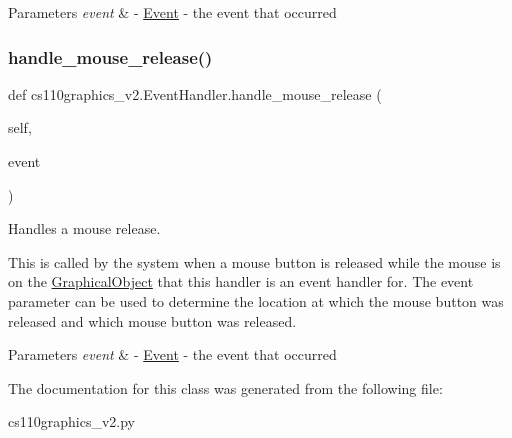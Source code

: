 \begin{DoxyParams}{Parameters}
{\em event} & -\/ \mbox{\hyperlink{classcs110graphics__v2_1_1Event}{Event}} -\/ the event that occurred \\
\hline
\end{DoxyParams}
\mbox{\label{classcs110graphics__v2_1_1EventHandler_a78d4d8dfc24ea86540c3ce9cf2b27a24}} 
\subsubsection{\texorpdfstring{handle\_mouse\_release()}{handle\_mouse\_release()}}
{\footnotesize\ttfamily def cs110graphics\+\_\+v2.\+Event\+Handler.\+handle\+\_\+mouse\+\_\+release (\begin{DoxyParamCaption}\item[{}]{self,  }\item[{}]{event }\end{DoxyParamCaption})}



Handles a mouse release. 

This is called by the system when a mouse button is released while the mouse is on the \mbox{\hyperlink{classcs110graphics__v2_1_1GraphicalObject}{Graphical\+Object}} that this handler is an event handler for. The event parameter can be used to determine the location at which the mouse button was released and which mouse button was released. 
\begin{DoxyCode}{0}
\end{DoxyCode}
 
\begin{DoxyParams}{Parameters}
{\em event} & -\/ \mbox{\hyperlink{classcs110graphics__v2_1_1Event}{Event}} -\/ the event that occurred \\
\hline
\end{DoxyParams}


The documentation for this class was generated from the following file\+:\begin{DoxyCompactItemize}
\item 
cs110graphics\+\_\+v2.\+py\end{DoxyCompactItemize}
